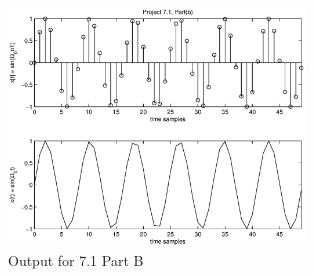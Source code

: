 
\begin{figure}[!htbp]
  \centering
    \includegraphics[width=0.7\textwidth]{Part1/Output/Figures/proj71PartB.eps}
  \caption{Output for 7.1 Part B}
\end{figure}
